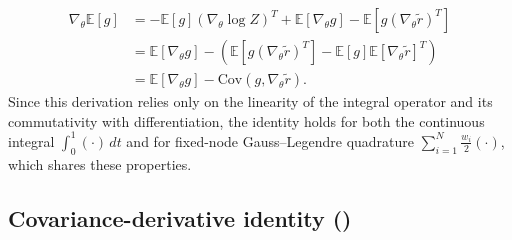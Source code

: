 \documentclass{article}
\begin{document}
\begin{align}
  \nabla_\theta \mathbb{E}[g] & = - \mathbb{E}[g] (\nabla_\theta \log Z)^{T} + \mathbb{E}[\nabla_\theta g] - \mathbb{E}[g (\nabla_\theta \tilde{r})^{T}]                         \\
                              & = \mathbb{E}[\nabla_\theta g] - \left(\mathbb{E}[g (\nabla_\theta \tilde{r})^{T}] - \mathbb{E}[g] \mathbb{E}[\nabla_\theta \tilde{r}]^{T}\right) \\
                              & = \mathbb{E}[\nabla_\theta g] - \mathrm{Cov}(g, \nabla_\theta \tilde{r}).
\end{align}
%
Since this derivation relies only on the linearity of the integral operator and its commutativity with differentiation, the identity holds for both the continuous integral $\int_0^1 (\cdot) \, dt$ and for fixed-node Gauss--Legendre quadrature $\sum_{i=1}^N \frac{w_i}{2} (\cdot)$, which shares these properties.

\subsection{Covariance-derivative identity ()}\label{app:proof-covariance-derivative}
\end{document}
